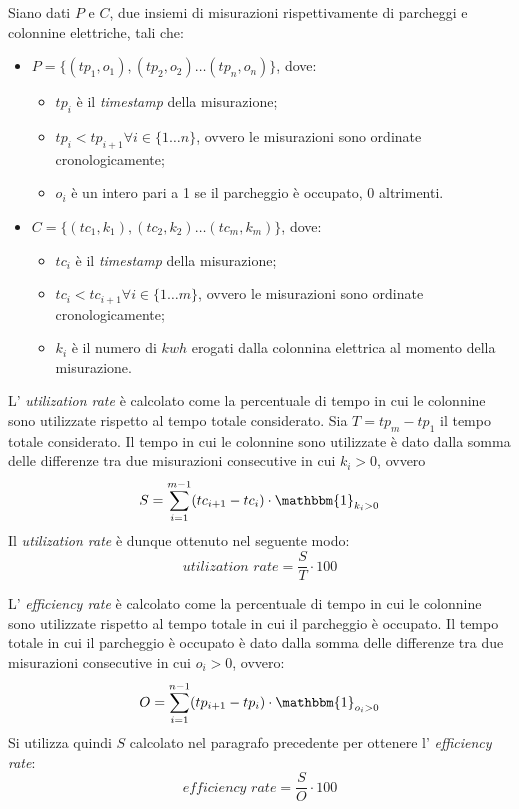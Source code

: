 Siano dati $P$ e $C$, due insiemi di misurazioni rispettivamente di parcheggi e colonnine elettriche, tali che:
\begin{itemize}
	\item $P = \{(tp_1, o_1), (tp_2, o_2)\ldots (tp_n, o_n)\}$, dove:
	      \begin{itemize}
		      \item $tp_i$ è il \textit{timestamp} della misurazione;
		      \item $tp_i < tp_{i+1}\forall i\in\{1\ldots n\}$, ovvero le misurazioni sono ordinate cronologicamente;
		      \item $o_i$ è un intero pari a 1 se il parcheggio è occupato, 0 altrimenti.
	      \end{itemize}
	\item $C = \{(tc_1, k_1), (tc_2, k_2)\ldots (tc_m, k_m)\}$, dove:
	      \begin{itemize}
		      \item $tc_i$ è il \textit{timestamp} della misurazione;
		      \item $tc_i < tc_{i+1}\forall i\in\{1\ldots m\}$, ovvero le misurazioni sono ordinate cronologicamente;
		      \item $k_i$ è il numero di $kwh$ erogati dalla colonnina elettrica al momento della misurazione.
	      \end{itemize}
\end{itemize}

L' \textit{utilization rate} è calcolato come la percentuale di tempo in cui le colonnine sono utilizzate rispetto al tempo totale considerato.
Sia $T = tp_m - tp_1$ il tempo totale considerato. Il tempo in cui le colonnine sono utilizzate è dato dalla somma delle differenze tra due misurazioni consecutive
in cui $k_i > 0$, ovvero
\[
	S = \sum_{i=1}^{m-1} (tc_{i+1} - tc_i) \cdot \mathbbm{1}_{k_i > 0}
\]
Il \textit{utilization rate} è dunque ottenuto nel seguente modo:
\[
	\textit{utilization rate} = \frac{S}{T} \cdot 100
\]

L' \textit{efficiency rate} è calcolato come la percentuale di tempo in cui le colonnine sono utilizzate rispetto al tempo totale in cui il parcheggio è occupato.
Il tempo totale in cui il parcheggio è occupato è dato dalla somma delle differenze tra due misurazioni consecutive in cui $o_i > 0$, ovvero:
\[
	O = \sum_{i=1}^{n-1} (tp_{i+1} - tp_i) \cdot \mathbbm{1}_{o_i > 0}
\]
Si utilizza quindi $S$ calcolato nel paragrafo precedente per ottenere l' \textit{efficiency rate}:
\[
	\textit{efficiency rate} = \frac{S}{O} \cdot 100
\]



